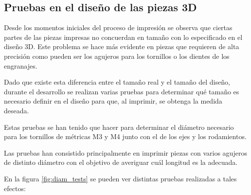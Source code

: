 \subsection{Pruebas en el diseño de las piezas 3D}
Desde los momentos iniciales del proceso de impresión se observa que ciertas partes de las piezas impresas no concuerdan en tamaño con lo especificado en el diseño 3D. Este problema se hace más evidente en piezas que requieren de alta precisión como pueden ser los agujeros para los tornillos o los dientes de los engranajes.

Dado que existe esta diferencia entre el tamaño real y el tamaño del diseño, durante el desarrollo se realizan varias pruebas para determinar qué tamaño es necesario definir en el diseño para que, al imprimir, se obtenga la medida deseada.

Estas pruebas se han tenido que hacer para determinar el diámetro necesario para los tornillos de métricas M3 y M4 junto con el de los ejes y los rodamientos.

Las pruebas han consistido principalmente en imprimir piezas con varios agujeros de distinto diámetro con el objetivo de averiguar cuál longitud es la adecuada.

En la figura \ref{fig:diam_tests} se pueden ver distintas pruebas realizadas a tales
efectos:

